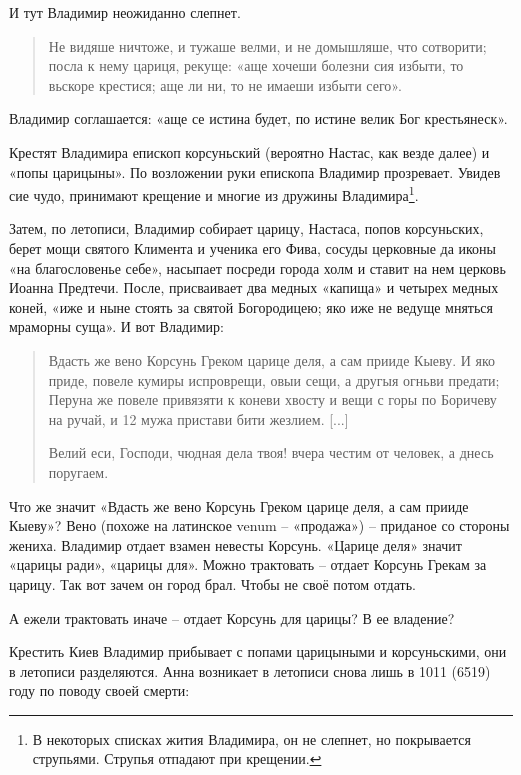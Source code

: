 И тут Владимир неожиданно слепнет. 

\begin{quotation}
Не видяше ничтоже, и тужаше велми, и не домышляше, что сотворити; посла к нему цариця, рекуще: «аще хочеши болезни сия избыти, то вьскоре крестися; аще ли ни, то не имаеши избыти сего». 
\end{quotation}

Владимир соглашается: «аще се истина будет, по истине велик Бог крестьянеск».

Крестят Владимира епископ корсуньский (вероятно Настас, как везде далее) и «попы царицыны». По возложении руки епископа Владимир прозревает. Увидев сие чудо, принимают крещение и многие из дружины Владимира\footnote{В некоторых списках жития Владимира, он не слепнет, но покрывается струпьями. Струпья отпадают при крещении.}.

Затем, по летописи, Владимир собирает царицу, Настаса, попов корсуньских, берет мощи святого Климента и ученика его Фива, сосуды церковные да иконы «на благословенье себе», насыпает посреди города холм и ставит на нем церковь Иоанна Предтечи. После, присваивает два медных «капища» и четырех медных коней, «иже и ныне стоять за святой Богородицею; яко иже не ведуще мняться мраморны суща». И вот Владимир:

\begin{quotation}
Вдасть же вено Корсунь Греком царице деля, а сам прииде Кыеву. И яко приде, повеле кумиры испроврещи, овыи сещи, а другыя огньви предати; Перуна же повеле привязяти к коневи хвосту и вещи с горы по Боричеву на ручай, и 12 мужа пристави бити жезлием. [...]

Велий еси, Господи, чюдная дела твоя! вчера честим от человек, а днесь поругаем.
\end{quotation}

Что же значит «Вдасть же вено Корсунь Греком царице деля, а сам прииде Кыеву»? Вено (похоже на латинское venum – «продажа») – приданое со стороны жениха. Владимир отдает взамен невесты Корсунь. «Царице деля» значит «царицы ради», «царицы для». Можно трактовать – отдает Корсунь Грекам за царицу. Так вот зачем он город брал. Чтобы не своё потом отдать.

А ежели трактовать иначе – отдает Корсунь для царицы? В ее владение?

Крестить Киев Владимир прибывает с попами царицыными и корсуньскими, они в летописи разделяются. Анна возникает в летописи снова лишь в 1011 (6519) году по поводу своей смерти:

